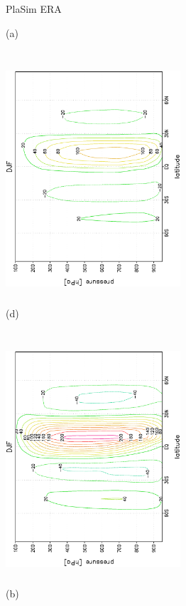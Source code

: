 \documentclass[12pt,a4paper,twoside,openright,headinclude,liststotoc,bibtotoc]{scrreprt}
\begin{document}
\begin{figure}[H]
\hspace{4.1cm}PlaSim \hspace{7.4cm} ERA \\
\parbox{8.5cm}{\hspace{1.05cm}\begin{scriptsize}(a)\end{scriptsize} \vspace{-0.5cm} \\
\includegraphics[height=8.5cm,width=6.5cm,angle=-90]
{eps/levelstreamDJF272.eps}
}
\parbox{8.5cm}{\hspace{1.05cm}\begin{scriptsize}(d)\end{scriptsize} \vspace{-0.5cm} \\
\includegraphics[height=8.5cm,width=6.5cm,angle=-90]
{eps/t21levelstreamDJF272.eps}
}
\parbox{8.5cm}{\hspace{1.05cm}\begin{scriptsize}(b)\end{scriptsize} \vspace{-0.5cm} \\
}
\end{figure}
\end{document}
